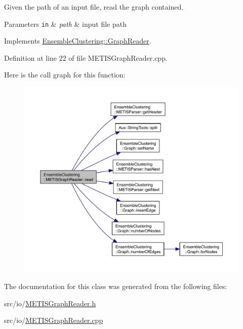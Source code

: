 Given the path of an input file, read the graph contained. 


\begin{DoxyParams}[1]{Parameters}
\mbox{\tt in}  & {\em path} & input file path \\
\hline
\end{DoxyParams}


Implements \hyperlink{class_ensemble_clustering_1_1_graph_reader_af5e1d1071dabe620f2ee52577c641f4d}{Ensemble\-Clustering\-::\-Graph\-Reader}.



Definition at line 22 of file M\-E\-T\-I\-S\-Graph\-Reader.\-cpp.



Here is the call graph for this function\-:
\nopagebreak
\begin{figure}[H]
\begin{center}
\leavevmode
\includegraphics[width=350pt]{class_ensemble_clustering_1_1_m_e_t_i_s_graph_reader_acd3a939db7153658afc805092c243ffb_cgraph}
\end{center}
\end{figure}




The documentation for this class was generated from the following files\-:\begin{DoxyCompactItemize}
\item 
src/io/\hyperlink{_m_e_t_i_s_graph_reader_8h}{M\-E\-T\-I\-S\-Graph\-Reader.\-h}\item 
src/io/\hyperlink{_m_e_t_i_s_graph_reader_8cpp}{M\-E\-T\-I\-S\-Graph\-Reader.\-cpp}\end{DoxyCompactItemize}
